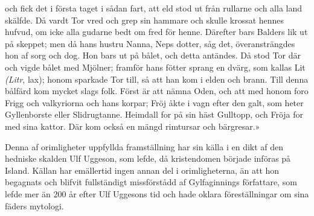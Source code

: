 och fick det i första taget i sådan fart, att eld stod ut från rullarne
och alla land skälfde. Då vardt Tor vred och grep sin hammare och skulle
krossat hennes hufvud, om icke alla gudarne bedt om fred för henne.
Därefter bars Balders lik ut på skeppet; men då hans hustru Nanna, Neps
dotter, såg det, överansträngdes hon af sorg och dog. Hon bars ut på
bålet, och detta antändes. Då stod Tor där och vigde bålet med Mjölner;
framför hans fötter sprang en dvärg, som kallas Lit \emph{(Litr}, lax);
honom sparkade Tor till, så att han kom i elden och brann. Till denna
bålfärd kom mycket slags folk. Först är att nämna Oden, och att med
honom foro Frigg och valkyriorna och hans korpar; Fröj åkte i vagn efter
den galt, som heter Gyllenborste eller Slidrugtanne. Heimdall for på sin
häst Gulltopp, och Fröja for med sina kattor. Där kom också en mängd
rimtursar och bärgresar.»

Denna af orimligheter uppfyllda framställning har sin källa i en dikt af
den hedniske skalden Ulf Uggeson, som lefde, då kristendomen började
införas på Island. Källan har emällertid ingen annan del i
orimligheterna, än att hon begagnats och blifvit fullständigt
missförstådd af Gylfaginnings författare, som lefde mer än 200 år efter
Ulf Uggesons tid och hade oklara föreställningar om sina fäders
mytologi.

